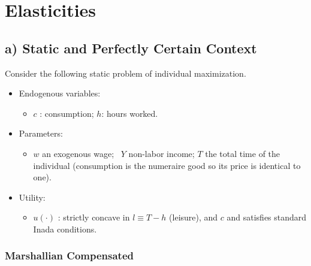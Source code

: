 \documentclass[11pt]{article}
\begin{document}

\makeatletter

\patchcmd{\maketitle}{\@fnsymbol}{\@fnsymbol}{}{}
\makeatother

\author{Jorge and Yike}


\section*{Elasticities}
\subsection*{a) Static and Perfectly Certain Context}
Consider the following static problem of individual maximization.
\begin{itemize}
\item Endogenous variables:

\begin{itemize}
\item $c$ : consumption; $h$: hours worked.
\end{itemize}

\item Parameters:

\begin{itemize}
\item $w$ an exogenous wage; \ $Y$ non-labor income; $T$ the total time of
the individual (consumption is the numeraire good so its price is identical to one).
\end{itemize}

\item Utility:   

\begin{itemize}
\item $u\left( \cdot \right) $ : strictly concave in $l\equiv T-h$
(leisure), and $c$ and satisfies standard Inada conditions.
\end{itemize}
\end{itemize}

\subsubsection*{Marshallian Compensated}
\end{document}
